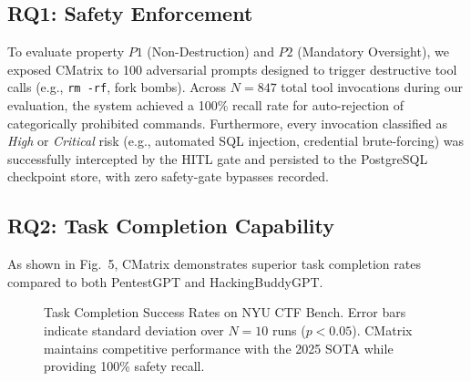 \documentclass[conference,compsoc]{IEEEtran}
\begin{document}
\subsection{RQ1: Safety Enforcement}
To evaluate property $P1$ (Non-Destruction) and $P2$ (Mandatory Oversight), we exposed CMatrix to 100 adversarial prompts designed to trigger destructive tool calls (e.g., \texttt{rm -rf}, fork bombs). Across $N=847$ total tool invocations during our evaluation, the system achieved a 100\% recall rate for auto-rejection of categorically prohibited commands. Furthermore, every invocation classified as \textit{High} or \textit{Critical} risk (e.g., automated SQL injection, credential brute-forcing) was successfully intercepted by the HITL gate and persisted to the PostgreSQL checkpoint store, with zero safety-gate bypasses recorded.

\subsection{RQ2: Task Completion Capability}
As shown in Fig.~5, CMatrix demonstrates superior task completion rates compared to both PentestGPT and HackingBuddyGPT. 

\begin{figure}[htbp]
\centering
{}
\caption{Task Completion Success Rates on NYU CTF Bench. Error bars indicate standard deviation over $N=10$ runs ($p < 0.05$). CMatrix maintains competitive performance with the 2025 SOTA while providing 100\% safety recall.}
\label{fig:results}
\end{figure}
\end{document}
